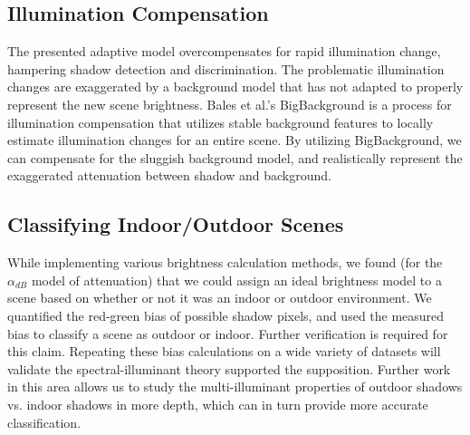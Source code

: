\documentclass[12pt]{report}
\begin{document}
\subsection{Illumination Compensation}

The presented adaptive model overcompensates for rapid illumination change, hampering shadow detection and discrimination. The problematic illumination changes are exaggerated by a background model that has not adapted to properly represent the new scene brightness. Bales et al.'s BigBackground is a process for illumination compensation that utilizes stable background features to locally estimate illumination changes for an entire scene. By utilizing BigBackground, we can compensate for the sluggish background model, and realistically represent the exaggerated attenuation between shadow and background.

\subsection{Classifying Indoor/Outdoor Scenes}

While implementing various brightness calculation methods, we found (for the $\alpha_{dB}$ model of attenuation) that we could assign an ideal brightness model to a scene based on whether or not it was an indoor or outdoor environment. We quantified the red-green bias of possible shadow pixels, and used the measured bias to classify a scene as outdoor or indoor. Further verification is required for this claim. Repeating these bias calculations on a wide variety of datasets will validate the spectral-illuminant theory supported the supposition. Further work in this area allows us to study the multi-illuminant properties of outdoor shadows vs. indoor shadows in more depth, which can in turn provide more accurate classification. 
\end{document}
